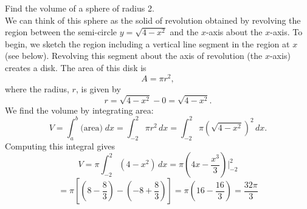 \documentclass{ximera}
\begin{document}
\begin{example}[example 2]
Find the volume of a sphere of radius 2.\\
We can think of this sphere as the solid of revolution obtained by revolving the region between 
the semi-circle $y = \sqrt{4-x^2}$ and the $x$-axis about the $x$-axis.
To begin, we sketch the region  including a vertical line segment in the region at $x$ (see below). 
Revolving this segment about the axis of revolution (the $x$-axis) creates a disk.  The area of this disk is
\[
A = \pi r^2,
\]
where the radius, $r$, is given by
\[
r = \sqrt{4 - x^2} - 0 = \sqrt{4-x^2}.
\]
We find the volume by integrating area:
\[
V = \int_a^b \text{(area)} \; dx = \int_{-2}^2 \pi r^2 \, dx = \int_{-2}^2 \pi \left(\sqrt{4-x^2}\right)^2 \, dx.
\]
Computing this integral gives
\[
V = \pi \int_{-2}^2 (4 - x^2) \, dx = \pi \left(4x - \frac{x^3}{3}\right) \bigg |_{-2}^2 
\]
\[
= \pi \left[\left(8 - \frac83 \right) - \left(-8 + \frac83\right)\right] = \pi \left(16 - \frac{16}{3}\right)
= \frac{32 \pi}{3}
\]


\begin{image}
\end{image}




\end{example}
\end{document}
